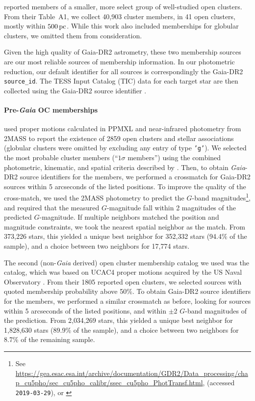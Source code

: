 \documentclass[12pt,twocolumn,tighten]{aastex62}
\begin{document}
\citet{gaia_hr_2018} reported members of a smaller, more select group
of well-studied open clusters. From their Table~A1, we collect
40{,}903 cluster members, in 41 open clusters, mostly within
$500\,{\rm pc}$. While this work also included memberships for
globular clusters, we omitted them from consideration.

Given the high quality of Gaia-DR2 astrometry, these two membership
sources are our most reliable sources of membership information.  In
our photometric reduction,  our default identifier for all sources is
correspondingly the Gaia-DR2 \texttt{source\_id}.  The TESS Input
Catalog (TIC) data for each target star are then collected using the
Gaia-DR2 source identifier \citep{stassun_TIC_2018,stassun_TIC8_2019}.  

\paragraph{Pre-{\it Gaia} OC memberships}

\citet{Kharchenko_et_al_2013} used proper motions calculated in PPMXL
\citep[][a combination of USNO-B1{.}0 and 2MASS
astrometry]{roeser_ppmxl_2010} and near-infrared photometry from 2MASS
\citep{skrutskie_tmass_2006} to report the existence of 2859 open
clusters and stellar associations (globular clusters were omitted by
excluding any entry of type \texttt{'g'}).  We selected the most
probable cluster members (``$1\sigma$ members'') using the combined
photometric, kinematic, and spatial criteria described by
\citet[][Section~3.3]{kharchenko_global_2012}.  Then, to obtain {\it
Gaia}-DR2 source identifiers for the members, we performed a
crossmatch for Gaia-DR2 sources within 5 arcseconds of the listed
positions.  To improve the quality of the cross-match, we used the
2MASS photometry to predict the $G$-band magnitudes\footnote{See
\url{https://gea.esac.esa.int/archive/documentation/GDR2/Data_processing/chap_cu5pho/sec_cu5pho_calibr/ssec_cu5pho_PhotTransf.html},
(accessed \texttt{2019-03-29}), or \citet{carrasco_gaia_2016}}, and
required that the measured $G$-magnitude fall within 2 magnitudes of
the predicted $G$-magnitude.  If multiple neighbors matched the
position and magnitude constraints, we took the nearest spatial
neighbor as the match.  From 373{,}226 stars, this yielded a unique
best neighbor for 352{,}332 stars (94.4\% of the sample), and a choice
between two neighbors for 17{,}774 stars. 

The second (non-{\it Gaia} derived) open cluster membership catalog we
used was the \citet{dias_proper_2014} catalog, which was based on
UCAC4 proper motions acquired by the US Naval Observatory
\citep{zacharias_fourth_2013}.  From their 1805 reported open
clusters, we selected sources with quoted membership probability above
50\%.  To obtain Gaia-DR2 source identifiers for the members, we
performed a similar crossmatch as before, looking for sources within 5
arcseconds of the listed positions, and within $\pm$2 $G$-band
magnitudes of the prediction.  From 2{,}034{,}269 stars, this yielded
a unique best neighbor for 1{,}828{,}630 stars (89.9\% of the sample),
and a choice between two neighbors for 8.7\% of the remaining sample. 
\end{document}
